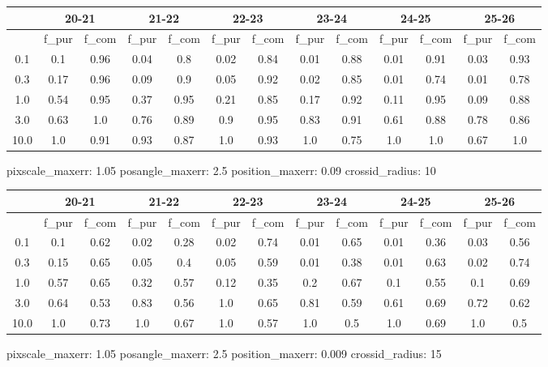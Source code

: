 \documentclass{article}
\begin{document}
\begin{figure}[H]
\centering
\begin{tabular}{|c|c|c|c|c|c|c|c|c|c|c|c|c|}
\hline
\multicolumn{1}{|c|}{} & \multicolumn{2}{|c|}{20-21} & \multicolumn{2}{|c|}{21-22} & \multicolumn{2}{|c|}{22-23} & \multicolumn{2}{|c|}{23-24} & \multicolumn{2}{|c|}{24-25} & \multicolumn{2}{|c|}{25-26}\\
\hline \hline
 & f\_pur & f\_com & f\_pur & f\_com & f\_pur & f\_com & f\_pur & f\_com & f\_pur & f\_com & f\_pur & f\_com \\
\hline
0.1 & 0.1 & 0.96 & 0.04 & 0.8 & 0.02 & 0.84 & 0.01 & 0.88 & 0.01 & 0.91 & 0.03 & 0.93\\
\hline
0.3 & 0.17 & 0.96 & 0.09 & 0.9 & 0.05 & 0.92 & 0.02 & 0.85 & 0.01 & 0.74 & 0.01 & 0.78\\
\hline
1.0 & 0.54 & 0.95 & 0.37 & 0.95 & 0.21 & 0.85 & 0.17 & 0.92 & 0.11 & 0.95 & 0.09 & 0.88\\
\hline
3.0 & 0.63 & 1.0 & 0.76 & 0.89 & 0.9 & 0.95 & 0.83 & 0.91 & 0.61 & 0.88 & 0.78 & 0.86\\
\hline
10.0 & 1.0 & 0.91 & 0.93 & 0.87 & 1.0 & 0.93 & 1.0 & 0.75 & 1.0 & 1.0 & 0.67 & 1.0\\
\hline
\end{tabular}
\caption{pixscale\_maxerr: 1.05 posangle\_maxerr: 2.5 position\_maxerr: 0.09 crossid\_radius: 10}
\end{figure}

\begin{figure}[H]
\centering
\begin{tabular}{|c|c|c|c|c|c|c|c|c|c|c|c|c|}
\hline
\multicolumn{1}{|c|}{} & \multicolumn{2}{|c|}{20-21} & \multicolumn{2}{|c|}{21-22} & \multicolumn{2}{|c|}{22-23} & \multicolumn{2}{|c|}{23-24} & \multicolumn{2}{|c|}{24-25} & \multicolumn{2}{|c|}{25-26}\\
\hline \hline
 & f\_pur & f\_com & f\_pur & f\_com & f\_pur & f\_com & f\_pur & f\_com & f\_pur & f\_com & f\_pur & f\_com \\
\hline
0.1 & 0.1 & 0.62 & 0.02 & 0.28 & 0.02 & 0.74 & 0.01 & 0.65 & 0.01 & 0.36 & 0.03 & 0.56\\
\hline
0.3 & 0.15 & 0.65 & 0.05 & 0.4 & 0.05 & 0.59 & 0.01 & 0.38 & 0.01 & 0.63 & 0.02 & 0.74\\
\hline
1.0 & 0.57 & 0.65 & 0.32 & 0.57 & 0.12 & 0.35 & 0.2 & 0.67 & 0.1 & 0.55 & 0.1 & 0.69\\
\hline
3.0 & 0.64 & 0.53 & 0.83 & 0.56 & 1.0 & 0.65 & 0.81 & 0.59 & 0.61 & 0.69 & 0.72 & 0.62\\
\hline
10.0 & 1.0 & 0.73 & 1.0 & 0.67 & 1.0 & 0.57 & 1.0 & 0.5 & 1.0 & 0.69 & 1.0 & 0.5\\
\hline
\end{tabular}
\caption{pixscale\_maxerr: 1.05 posangle\_maxerr: 2.5 position\_maxerr: 0.009 crossid\_radius: 15}
\end{figure}
\end{document}

